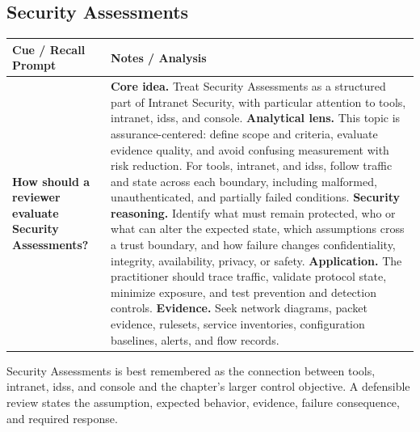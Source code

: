 \documentclass[11pt]{article}
\newcommand{\CornellHeader}{%
\rowcolor{Navy}\color{white}\bfseries Cue / Recall Prompt & \color{white}\bfseries Notes / Analysis\\\hline}
\newcommand{\CornellRow}[2]{%
\cellcolor{CueGray}\RaggedRight\textbf{#1} & \RaggedRight #2\\\hline}
\begin{document}
\subsection*{Security Assessments}
\begin{longtable}{>{\RaggedRight\arraybackslash}p{}|>{\RaggedRight\arraybackslash}p{}}
\CornellHeader
\CornellRow{How should a reviewer evaluate Security Assessments?}{\textbf{Core idea.} Treat Security Assessments as a structured part of Intranet Security, with particular attention to tools, intranet, idss, and console. \textbf{Analytical lens.} This topic is assurance-centered: define scope and criteria, evaluate evidence quality, and avoid confusing measurement with risk reduction. For tools, intranet, and idss, follow traffic and state across each boundary, including malformed, unauthenticated, and partially failed conditions. \textbf{Security reasoning.} Identify what must remain protected, who or what can alter the expected state, which assumptions cross a trust boundary, and how failure changes confidentiality, integrity, availability, privacy, or safety. \textbf{Application.} The practitioner should trace traffic, validate protocol state, minimize exposure, and test prevention and detection controls. \textbf{Evidence.} Seek network diagrams, packet evidence, rulesets, service inventories, configuration baselines, alerts, and flow records.}
\end{longtable}
\begin{topicsummary}
Security Assessments is best remembered as the connection between tools, intranet, idss, and console and the chapter's larger control objective. A defensible review states the assumption, expected behavior, evidence, failure consequence, and required response.
\end{topicsummary}
\end{document}
